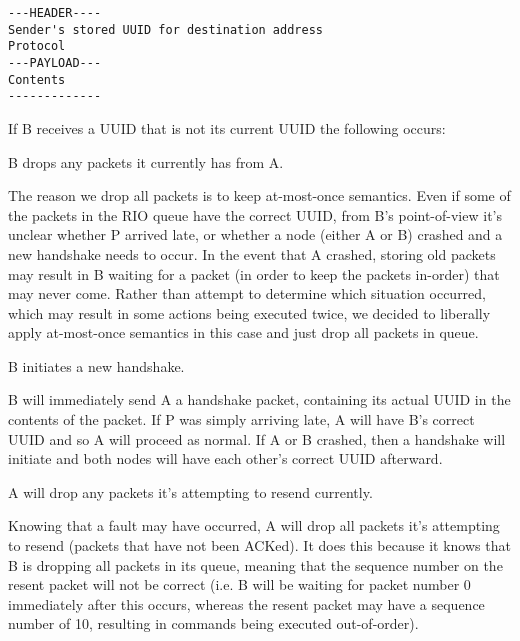 \documentclass[11pt]{article}
\begin{document}
\begin{verbatim}
---HEADER----
Sender's stored UUID for destination address
Protocol
---PAYLOAD---
Contents
-------------
\end{verbatim}

If B receives a UUID that is not its current UUID the following occurs:

\begin{description}
   \item B drops any packets it currently has from A.
   \begin{description}
         \item The reason we drop all packets is to keep at-most-once semantics. Even if some of the packets in the RIO queue have the correct UUID, from B's point-of-view it's unclear whether P arrived late, or whether a node (either A or B) crashed and a new handshake needs to occur. In the event that A crashed, storing old packets may result in B waiting for a packet (in order to keep the packets in-order) that may never come. Rather than attempt to determine which situation occurred, which may result in some actions being executed twice, we decided to liberally apply at-most-once semantics in this case and just drop all packets in queue.
	 \end{description}
   \item B initiates a new handshake.
	 \begin{description}
         \item B will immediately send A a handshake packet, containing its actual UUID in the contents of the packet. If P was simply arriving late,     A will have B's correct UUID and so A will proceed as normal. If A or B crashed, then a handshake will initiate and both nodes will have each other's correct UUID afterward.
	 \end{description}
   \item A will drop any packets it's attempting to resend currently.
	 \begin{description}
         \item Knowing that a fault may have occurred, A will drop all packets it's attempting to resend (packets that have not been ACKed). It does this because it knows that B is dropping all packets in its queue, meaning that the sequence number on the resent packet will not be correct (i.e. B will be waiting for packet number 0 immediately after this occurs, whereas the resent packet may have a sequence number of 10, resulting in commands being executed out-of-order).
	 \end{description}
\end{description}
\end{document}

